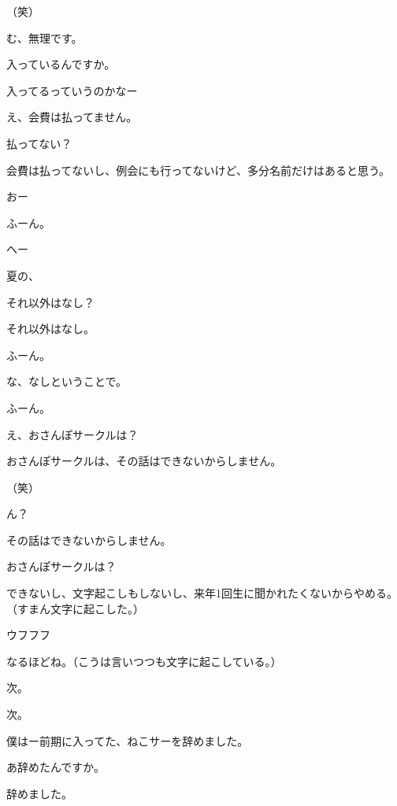 \begin{multicols}{3}
{        （笑）

        む、無理です。

        入っているんですか。

        入ってるっていうのかなー

        え、会費は払ってません。

        払ってない？

        会費は払ってないし、例会にも行ってないけど、多分名前だけはあると思う。

        おー

        ふーん。

        へー

        夏の、

        それ以外はなし？

        それ以外はなし。

        ふーん。

        な、なしということで。

        ふーん。

        え、おさんぽサークルは？

        おさんぽサークルは、その話はできないからしません。

        （笑）

        ん？

        その話はできないからしません。

        おさんぽサークルは？

        できないし、文字起こしもしないし、来年1回生に聞かれたくないからやめる。（すまん文字に起こした。）

        ウフフフ

        なるほどね。（こうは言いつつも文字に起こしている。）

        次。

        次。

        僕はー前期に入ってた、ねこサーを辞めました。

        あ辞めたんですか。

        辞めました。

}
\end{multicols}
